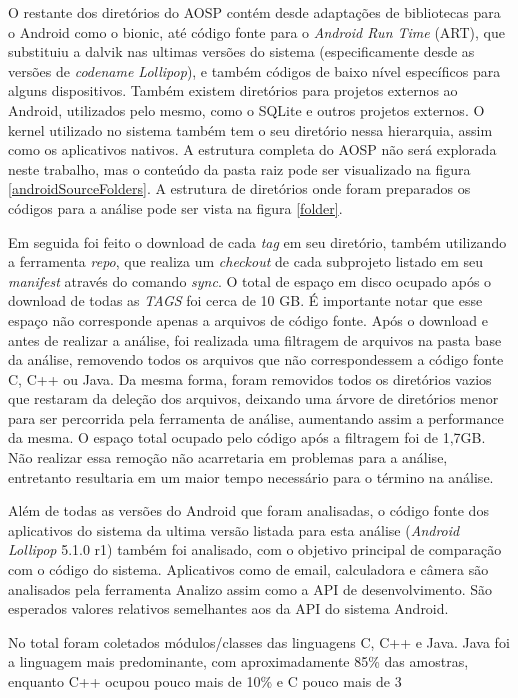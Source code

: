 O restante dos diretórios do AOSP contém desde adaptações de bibliotecas para o Android como o bionic, até código fonte para o \textit{Android Run Time} (ART), que substituiu a dalvik nas ultimas versões do sistema (especificamente desde as versões de \textit{codename Lollipop}), e também códigos de baixo nível específicos para alguns dispositivos. Também existem diretórios para projetos externos ao Android, utilizados pelo mesmo, como o SQLite e outros projetos externos. O kernel utilizado no sistema também tem o seu diretório nessa hierarquia, assim como os aplicativos nativos. A estrutura completa do AOSP não será explorada neste trabalho, mas o conteúdo da pasta raiz pode ser visualizado na figura \ref{androidSourceFolders}. A estrutura de diretórios onde foram preparados os códigos para a análise pode ser vista na figura \ref{folder}.

Em seguida foi feito o download de cada \textit{tag} em seu diretório, também utilizando a ferramenta \textit{repo}, que realiza um \textit{checkout} de cada subprojeto listado em seu \textit{manifest} através do comando \textit{sync}. O total de espaço em disco ocupado após o download de todas as \textit{TAGS} foi cerca de 10 GB. É importante notar que esse espaço não corresponde apenas a arquivos de código fonte. Após o download e antes de realizar a análise, foi realizada uma filtragem de arquivos na pasta base da análise, removendo todos os arquivos que não correspondessem a código fonte C, C++ ou Java. Da mesma forma, foram removidos todos os diretórios vazios que restaram da deleção dos arquivos, deixando uma árvore de diretórios menor para ser percorrida pela ferramenta de análise, aumentando assim a performance da mesma. O espaço total ocupado pelo código após a filtragem foi de 1,7GB. Não realizar essa remoção não acarretaria em problemas para a análise, entretanto resultaria em um maior tempo necessário para o término na análise.

Além de todas as versões do Android que foram analisadas, o código fonte dos aplicativos do sistema da ultima versão listada para esta análise (\textit{Android Lollipop} 5.1.0 r1) também foi analisado, com o objetivo principal de comparação com o código do sistema. Aplicativos como de email, calculadora e câmera são analisados pela ferramenta Analizo assim como a API de desenvolvimento. São esperados valores relativos semelhantes aos da API do sistema Android.

No total foram coletados módulos/classes das linguagens C, C++ e Java. Java foi a linguagem mais predominante, com aproximadamente 85\% das amostras, enquanto C++ ocupou pouco mais de 10\% e C pouco mais de 3%

